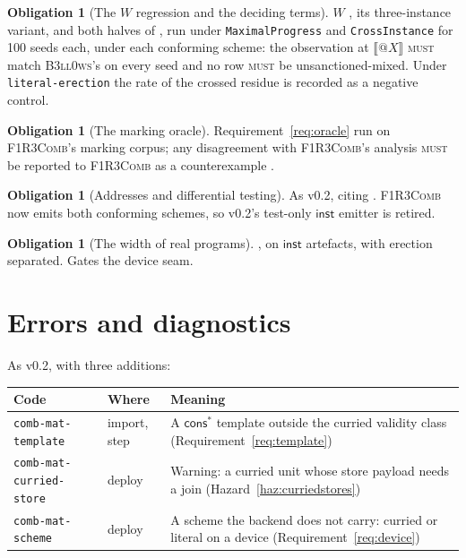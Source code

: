 \documentclass[11pt,a4paper]{article}
\makeatletter
\newcommand{\code}[1]{\texttt{#1}}
\newcommand{\Comb}{\textsc{F1R3Comb}}
\newcommand{\Bell}{\textsc{B3ll0ws}}
\newcommand{\MUST}{\textsc{must}}
\newcommand{\quo}[1]{@#1}
\theoremstyle{definition}
\newtheorem{obligation}[definition]{Obligation}
\theoremstyle{plain}
\newcommand{\inst}{\mathsf{inst}}
\newcommand{\enc}[1]{\llbracket #1 \rrbracket}
\newcommand{\cstar}{\mathsf{cons}^{*}}
\makeatother
\begin{document}
\begin{obligation}[The $W$ regression and the deciding terms]\label{obl:W}
$W$ \cite[Obl.~11.1]{combspec}, its three-instance variant, and both halves of
\cite[Req.~5.18]{combspec}, run under \code{MaximalProgress} and
\code{CrossInstance} for 100 seeds each, under each conforming scheme: the
observation at $\enc{\quo{X}}$ \MUST{} match \Bell's on every seed and no row
\MUST{} be unsanctioned-mixed. Under \code{literal-erection} the rate of the
crossed residue is recorded as a negative control.
\end{obligation}

\begin{obligation}[The marking oracle]\label{obl:marking}
Requirement~\ref{req:oracle} run on \Comb's marking corpus; any disagreement
with \Comb's analysis \MUST{} be reported to \Comb{} as a counterexample
\cite[Obl.~11.4]{combspec}.
\end{obligation}

\begin{obligation}[Addresses and differential testing]\label{obl:addr}
As v0.2, citing \cite[Obl.~11.7, 11.9, 11.12]{combspec}. \Comb{} now emits
both conforming schemes, so v0.2's test-only $\inst$ emitter is retired.
\end{obligation}

\begin{obligation}[The width of real programs]\label{obl:width}
\cite[Obl.~13.7]{matnote}, on $\inst$ artefacts, with erection separated.
Gates the device seam.
\end{obligation}

\section{Errors and diagnostics}\label{sec:errors}

As v0.2, with three additions:

\begin{center}
\begin{tabularx}{\linewidth}{@{}ll>{\raggedright\arraybackslash}X@{}}
\toprule
Code & Where & Meaning\\
\midrule
\code{comb-mat-template} & import, step & A $\cstar$ template outside the
curried validity class (Requirement~\ref{req:template})\\
\code{comb-mat-curried-store} & deploy & Warning: a curried unit whose store
payload needs a join (Hazard~\ref{haz:curriedstores})\\
\code{comb-mat-scheme} & deploy & A scheme the backend does not carry: curried
or literal on a device (Requirement~\ref{req:device})\\
\bottomrule
\end{tabularx}
\end{center}
\end{document}
